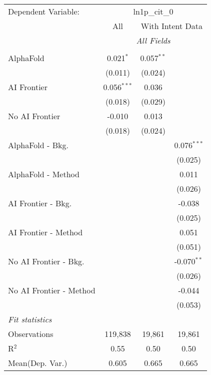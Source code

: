 \begingroup
\centering
\begin{tabular}{lccc}
   \tabularnewline \midrule \midrule
   Dependent Variable: & \multicolumn{3}{c}{ln1p\_cit\_0}\\
 & \multicolumn{1}{c}{All} & \multicolumn{2}{c}{With Intent Data} \\
\cmidrule(lr){2-2} \cmidrule(lr){3-4}
 & \multicolumn{3}{c}{\textit{All Fields}} \\ \\
   AlphaFold               & 0.021$^{*}$   & 0.057$^{**}$ &   \\   
                           & (0.011)       & (0.024)      &   \\   
   AI Frontier             & 0.056$^{***}$ & 0.036        &   \\   
                           & (0.018)       & (0.029)      &   \\   
   No AI Frontier          & -0.010        & 0.013        &   \\   
                           & (0.018)       & (0.024)      &   \\   
   AlphaFold - Bkg.        &               &              & 0.076$^{***}$\\   
                           &               &              & (0.025)\\   
   AlphaFold - Method      &               &              & 0.011\\   
                           &               &              & (0.026)\\   
   AI Frontier - Bkg.      &               &              & -0.038\\   
                           &               &              & (0.025)\\   
   AI Frontier - Method    &               &              & 0.051\\   
                           &               &              & (0.051)\\   
   No AI Frontier - Bkg.   &               &              & -0.070$^{**}$\\   
                           &               &              & (0.026)\\   
   No AI Frontier - Method &               &              & -0.044\\   
                           &               &              & (0.053)\\   
   \midrule
   \emph{Fit statistics}\\
   Observations            & 119,838       & 19,861       & 19,861\\  
   R$^2$                   & 0.55          & 0.50         & 0.50\\  
Mean(Dep. Var.) & 0.605 & 0.665 & 0.665 \\
   

\end{tabular}
